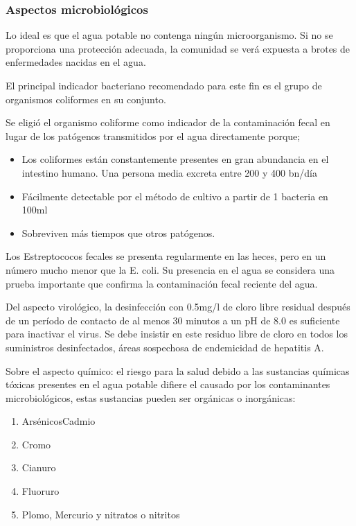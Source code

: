 \subsubsection{Aspectos microbiológicos}
Lo ideal es que el agua potable no contenga ningún microorganismo. Si no se proporciona una protección adecuada, la comunidad se verá expuesta a brotes de enfermedades nacidas en el agua.

El principal indicador bacteriano recomendado para este fin es el grupo de organismos coliformes en su conjunto.

Se eligió el organismo coliforme como indicador de la contaminación fecal en lugar de los patógenos transmitidos por el agua directamente porque;
\begin{itemize}
    \item Los coliformes están constantemente presentes en gran abundancia en el intestino humano. Una persona media excreta entre 200 y 400 bn/día
    \item Fácilmente detectable por el método de cultivo a partir de 1 bacteria en 100ml
    \item Sobreviven más tiempos que otros patógenos.
\end{itemize}
Los Estreptococos fecales se presenta regularmente en las heces, pero en un número mucho menor que la E. coli. Su presencia en el agua se considera una prueba importante que confirma la contaminación fecal reciente del agua.

Del aspecto virológico, la desinfección con 0.5mg/l de cloro libre residual después de un período de contacto de al menos 30 minutos a un pH de 8.0 es suficiente para inactivar el virus. Se debe insistir en este residuo libre de cloro en todos los suministros desinfectados, áreas sospechosa de endemicidad de hepatitis A.

Sobre el aspecto químico: el riesgo para la salud debido a las sustancias químicas tóxicas presentes en el agua potable difiere el causado por los contaminantes microbiológicos, estas sustancias pueden ser orgánicas o inorgánicas:
\begin{enumerate}
    \item ArsénicosCadmio
    \item Cromo
    \item Cianuro
    \item Fluoruro
    \item Plomo, Mercurio y nitratos o nitritos
\end{enumerate}

